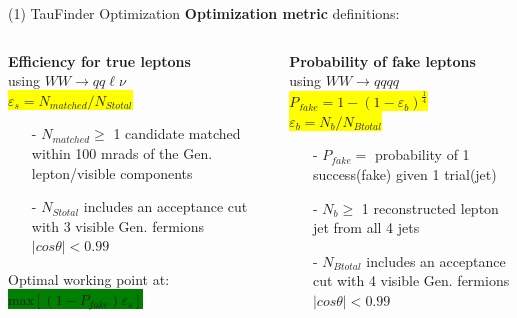 \documentclass[10pt]{beamer}
\begin{document}
\begin{frame}{(1) TauFinder Optimization}
\textbf{Optimization metric} definitions:\\
\begin{columns}
\begin{column}{0.5\textwidth}
\textbf{Efficiency for true leptons} \\
\scriptsize using $WW\rightarrow qq \ell \nu$ 
\\
\colorbox{yellow}{$\varepsilon_s = N_{matched}/N_{Stotal} $}\\
	\scriptsize
	\begin{itemize}
	\item[-] $N_{matched} \geq$ 1 candidate matched within 100 mrads of the Gen. lepton/visible components\\ 
	\item[-] $N_{Stotal}$ includes an acceptance cut with 3 visible Gen. fermions $|cos\theta |< 0.99$
	\end{itemize}
	\normalsize	
	Optimal working point at:\\
	\quad \quad \quad \colorbox{green}{ max$[(1-P_{fake}) \varepsilon_s]$}
\end{column}
\begin{column}{0.5\textwidth}
\textbf{Probability of fake leptons}\\
\scriptsize using $WW \rightarrow qqqq$ \\
\colorbox{yellow}{$P_{fake} = 1-(1 - \varepsilon_b)^{\frac{1}{4} }$}\\

\colorbox{yellow}{ $\varepsilon_b = N_b/N_{Btotal}$} \\
	\scriptsize
	\begin{itemize}
	\item[-] $P_{fake} =$ probability of 1 success(fake) given 1 trial(jet)\\
	\item[-] $N_b \geq$ 1 reconstructed lepton jet from all 4 jets\\
	\item[-] $N_{Btotal}$ includes an acceptance cut with 4 visible Gen. fermions $|cos\theta |< 0.99$
	\end{itemize}

\end{column}
\end{columns}

\end{frame}
\end{document}
